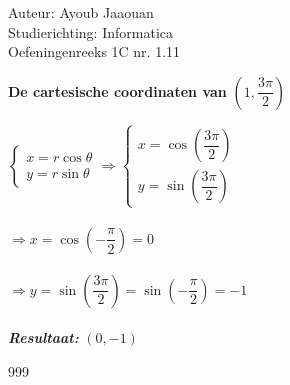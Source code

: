 \documentclass[a4paper]{article}
\begin{document}
  
\noindent \large Auteur: Ayoub Jaaouan          \\
\noindent \large Studierichting: Informatica   \\ 
\noindent \large Oefeningenreeks 1C nr. 1.11   \\

\medskip

\normalsize

\textbf{De cartesische coordinaten van} $\left(1, \dfrac{3\pi}{2}\right)$

$\left \{\begin{array}{l} x = r\cos\theta \\ y = r\sin\theta \end{array}\right. \Rightarrow \left \{\begin{array}{l} x = \cos\left(\dfrac{3\pi}{2}\right) \\ y = \sin\left(\dfrac{3\pi}{2}\right) \end{array}\right.$ \\\\



$\Rightarrow x = \cos\left(-\dfrac{\pi}{2}\right) = 0$\\\\

$\Rightarrow y = \sin\left(\dfrac{3\pi}{2}\right) = \sin\left(-\dfrac{\pi}{2}\right) = -1$\\\\

\textit{\textbf{Resultaat:}} $\left(0, -1\right)$


\begin{thebibliography}{999}

\end{thebibliography}
\end{document}
